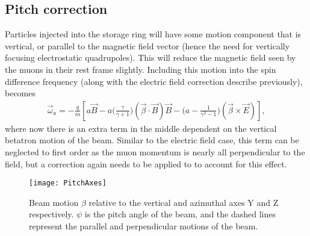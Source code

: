 \subsection{Pitch correction}

Particles injected into the \gmtwo storage ring will have some motion component that is vertical, or parallel to the magnetic field vector (hence the need for vertically focusing electrostatic quadrupoles). This will reduce the magnetic field seen by the muons in their rest frame slightly. Including this motion into the spin difference frequency (along with the electric field correction describe previously), \wa becomes
        \begin{align} \label{eq:wafinal}
            \vec{\omega}_{a} = -\frac{q}{m} [a\vec{B} - a \Big(\frac{\gamma}{\gamma+1}\Big)(\vec{\beta} \cdot \vec{B})\vec{B} - \Big(a - \frac{1}{\gamma^{2}-1}\Big)(\vec{\beta} \times \vec{E}) ],
        \end{align}
where now there is an extra term in the middle dependent on the vertical betatron motion of the beam. Similar to the electric field case, this term can be neglected to first order as the muon momentum is nearly all perpendicular to the field, but a correction again needs to be applied to \wa to account for this effect.

\begin{figure}[]
    \centering
    \texttt{[image: PitchAxes]}
    \caption[Pitching beam motion]{Beam motion $\beta$ relative to the vertical and azimuthal axes Y and Z respectively. $\psi$ is the pitch angle of the beam, and the dashed lines represent the parallel and perpendicular motions of the beam.}   
    \label{fig:PitchAxes}
\end{figure}


